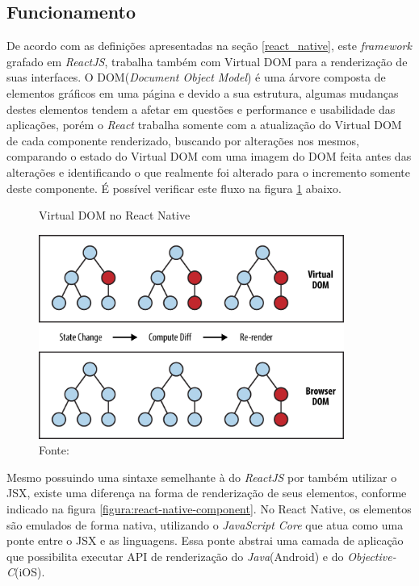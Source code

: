    \subsection{Funcionamento}
    
    De acordo com as definições apresentadas na seção \ref{react_native}, este \textit{framework} grafado em \textit{ReactJS}, trabalha também com Virtual DOM para a renderização de suas interfaces. O DOM(\textit{Document Object Model}) é uma árvore composta de elementos gráficos em uma página e devido a sua estrutura, algumas mudanças destes elementos tendem a afetar em questões e performance e usabilidade das aplicações, porém o \textit{React} trabalha somente com a atualização do Virtual DOM de cada componente renderizado, buscando por alterações nos mesmos, comparando o estado do Virtual DOM com uma imagem do DOM feita antes das alterações e identificando o que realmente foi alterado para o incremento somente deste componente. É possível verificar este fluxo na figura \ref{figura:virtual-dom} abaixo.
    
    \clearpage
    
    \begin{figure}[h]
    \caption{Virtual DOM no React Native}
    \centering %
    \includegraphics[width=10cm]{imagem/virtual-dom.png}
    \caption*{Fonte: \cite{Eisenman2016}}
    \label{figura:virtual-dom}
    \end{figure}
    
    Mesmo possuindo uma sintaxe semelhante à do \textit{ReactJS} por também utilizar o JSX, existe uma diferença na forma de renderização de seus elementos, conforme indicado na figura \ref{figura:react-native-component}. No React Native, os elementos são emulados de forma nativa, utilizando o \textit{JavaScript Core} que atua como uma ponte entre o JSX e as linguagens. Essa ponte abstrai uma camada de aplicação que possibilita executar API de renderização do \textit{Java}(Android) e do \textit{Objective-C}(iOS).
    

